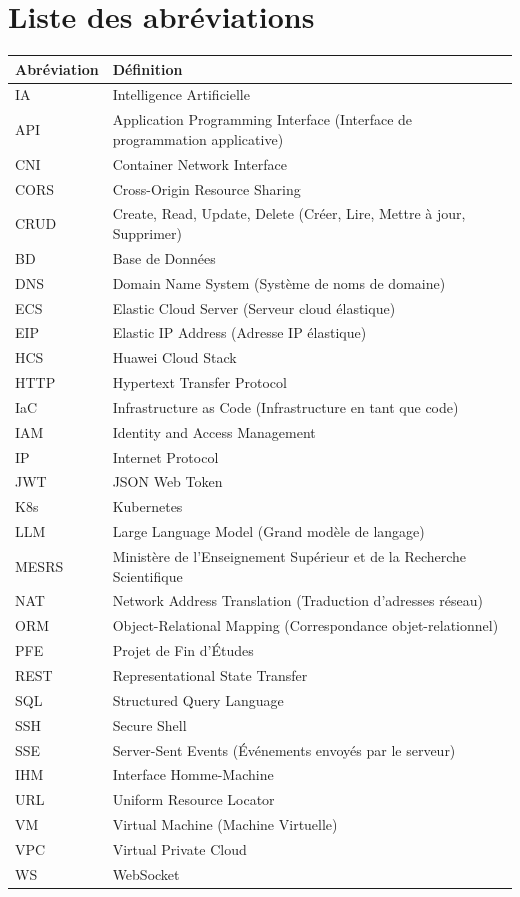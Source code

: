 \chapter*{Liste des abréviations}

\begin{tabular}{ll}
  \toprule
  \textbf{Abréviation} & \textbf{Définition} \\
  \midrule
  IA    & Intelligence Artificielle \\
  API   & Application Programming Interface (Interface de programmation applicative) \\
  CNI   & Container Network Interface \\
  CORS  & Cross-Origin Resource Sharing \\
  CRUD  & Create, Read, Update, Delete (Créer, Lire, Mettre à jour, Supprimer) \\
  BD    & Base de Données \\
  DNS   & Domain Name System (Système de noms de domaine) \\
  ECS   & Elastic Cloud Server (Serveur cloud élastique) \\
  EIP   & Elastic IP Address (Adresse IP élastique) \\
  HCS   & Huawei Cloud Stack \\
  HTTP  & Hypertext Transfer Protocol \\
  IaC   & Infrastructure as Code (Infrastructure en tant que code) \\
  IAM   & Identity and Access Management \\
  IP    & Internet Protocol \\
  JWT   & JSON Web Token \\
  K8s   & Kubernetes \\
  LLM   & Large Language Model (Grand modèle de langage) \\
  MESRS & Ministère de l'Enseignement Supérieur et de la Recherche Scientifique \\
  NAT   & Network Address Translation (Traduction d'adresses réseau) \\
  ORM   & Object-Relational Mapping (Correspondance objet-relationnel) \\
  PFE   & Projet de Fin d'Études \\
  REST  & Representational State Transfer \\
  SQL   & Structured Query Language \\
  SSH   & Secure Shell \\
  SSE   & Server-Sent Events (Événements envoyés par le serveur) \\
  IHM   & Interface Homme-Machine \\
  URL   & Uniform Resource Locator \\
  VM    & Virtual Machine (Machine Virtuelle) \\
  VPC   & Virtual Private Cloud \\
  WS    & WebSocket \\
  \bottomrule
\end{tabular}
\clearpage
